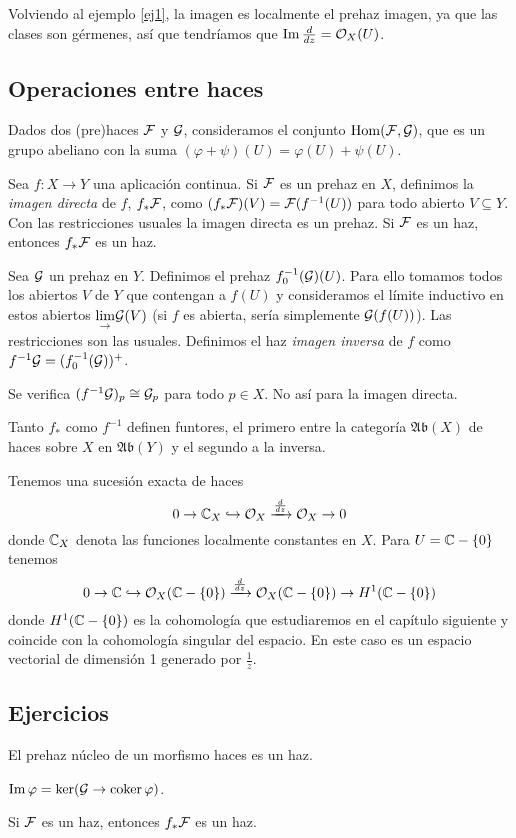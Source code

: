 \documentclass[GA.tex]{subfiles}
\begin{document}
\begin{ej}
Volviendo al ejemplo \ref{ej1}, la imagen es localmente el prehaz imagen, ya que las clases son gérmenes, así que tendríamos que $\operatorname{Im} \frac{d}{dz}={\mathcal O}_X(U)$. 
\end{ej}


\subsection{Operaciones entre haces}
Dados dos (pre)haces $\mathcal{F}$ y $\mathcal{G}$, consideramos el conjunto $\operatorname{Hom}(\mathcal{F},\mathcal{G})$, que es un grupo abeliano con la suma $(\varphi+\psi)(U)=\varphi(U)+\psi(U)$. 

\begin{defi}
Sea $f:X\to Y$ una aplicación continua. Si $\mathcal{F}$ es un prehaz en $X$, definimos la \emph{imagen directa} de $f$, $f_*\mathcal{F}$, como $(f_*\mathcal{F})(V)=\mathcal{F}(f^{-1}(U))$ para todo abierto $V\subseteq Y$. Con las restricciones usuales la imagen directa es un prehaz. Si $\mathcal{F}$ es un haz, entonces $f_*\mathcal{F}$ es un haz. 

Sea $\mathcal{G}$ un prehaz en $Y$. Definimos el prehaz $f^{-1}_0(\mathcal{G})(U)$. Para ello tomamos todos los abiertos $V$ de $Y$ que contengan a $f(U)$ y consideramos el límite inductivo en estos abiertos $\underset{\rightarrow}{\lim}\mathcal{G}(V)$ (si $f$ es abierta, sería simplemente $\mathcal{G}(f(U))$). Las restricciones son las usuales. Definimos el haz \emph{imagen inversa} de $f$ como $f^{-1}\mathcal{G}=(f^{-1}_0(\mathcal{G}))^+$. 
\end{defi}

\begin{prop}
Se verifica $(f^{-1}\mathcal{G})_p\cong \mathcal{G}_p$ para todo $p\in X$. No así para la imagen directa.
\end{prop}

Tanto $f_*$ como $f^{-1}$ definen funtores, el primero entre la categoría $\mathfrak{Ab}(X)$ de haces sobre $X$ en $\mathfrak{Ab}(Y)$ y el segundo a la inversa. 


\begin{ej}
Tenemos una sucesión exacta de haces 
\[
0\to \mathbb{C}_X \hookrightarrow {\mathcal O}_X\xrightarrow{\frac{d}{dz}}{\mathcal O}_X\to 0
\]
donde $\mathbb{C}_X$ denota las funciones localmente constantes en $X$. Para $U=\mathbb{C}-\{0\}$ tenemos
\[
0\to \mathbb{C} \hookrightarrow {\mathcal O}_X(\mathbb{C}-\{0\})\xrightarrow{\frac{d}{dz}}{\mathcal O}_X(\mathbb{C}-\{0\})\to H^1(\mathbb{C}-\{0\})
\]
donde $H^1(\mathbb{C}-\{0\})$ es la cohomología que estudiaremos en el capítulo siguiente y coincide con la cohomología singular del espacio. En este caso es un espacio vectorial de dimensión 1 generado por $\frac{1}{z}$. 
\end{ej}


\subsection{Ejercicios}


\begin{ejer}
El prehaz núcleo de un morfismo haces es un haz.
\end{ejer}

\begin{ejer}
$\operatorname{Im}\varphi=\ker (\mathcal{G}\to \operatorname{coker}\varphi)$. 
\end{ejer}

\begin{ejer}
Si $\mathcal{F}$ es un haz, entonces $f_*\mathcal{F}$ es un haz. 
\end{ejer}
\end{document}

